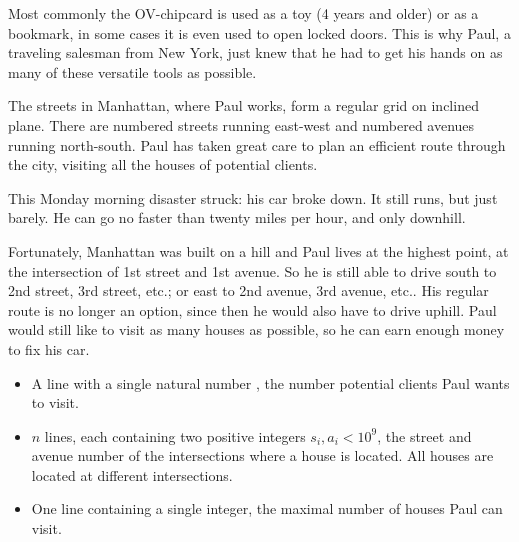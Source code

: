 


\def\tspname{Paul}

{\StandaardZin}
Most commonly the OV-chipcard is used as a toy (4 years and older) or as a bookmark, in some cases it is even used to open locked doors.
This is why {\tspname}, a traveling salesman from New York, just knew that he had to get his hands on as many of these versatile tools as possible. %

The streets in Manhattan, where {\tspname} works, form a regular grid on inclined plane.
There are numbered streets running east-west and numbered avenues running north-south.
{\tspname} has taken great care to plan an efficient route through the city, visiting all the houses of potential clients.

This Monday morning disaster struck: his car broke down.
It still runs, but just barely.
He can go no faster than twenty miles per hour, and only downhill.

Fortunately, Manhattan was built on a hill and {\tspname} lives at the highest point,
at the intersection of 1st street and 1st avenue.
So he is still able to drive south to 2nd street, 3rd street, etc.; or east to 2nd avenue, 3rd avenue, etc..
His regular route is no longer an option, since then he would also have to drive uphill.
{\tspname} would still like to visit as many houses as possible, so he can earn enough money to fix his car.

\Input
\begin{itemize}
 \item A line with a single natural number , the number potential clients {\tspname} wants to visit.
 \item $n$ lines, each containing two positive integers $s_i,a_i < 10^9$, the street and avenue number of the intersections where a house is located.
       All houses are located at different intersections.
\end{itemize}

\Output
\begin{itemize}
 \item One line containing a single integer, the maximal number of houses {\tspname} can visit.
\end{itemize}

\vfill %
\Example
